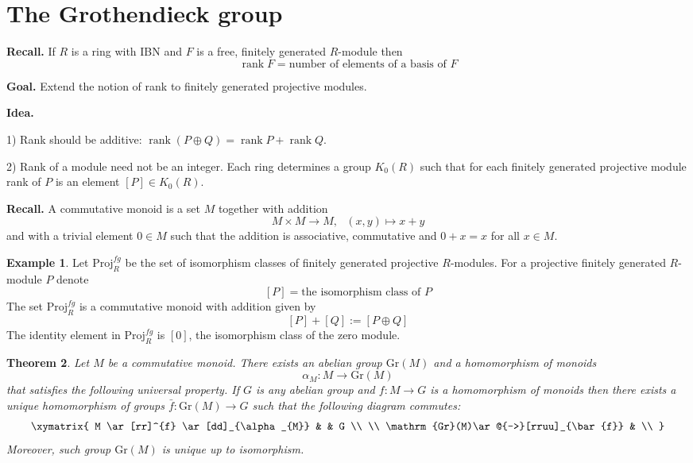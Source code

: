 \documentclass[12pt, letterpaper, oneside]{article}
\theoremstyle{plain}
\newtheorem{theorem}{Theorem}[section]
\theoremstyle{definition}
\newtheorem{example}[theorem]{Example}
\newcommand{\rank}{\operatorname{rank}}
\newcommand{\Projfg}{\mathrm {Proj}^{fg}}
\newcommand{\Gro}{\mathrm {Gr}}
\newcommand{\vs}{\vskip 5mm}
\begin{document}


\newpage
\section{The Grothendieck group}
\label{SEC_GROTHGROUP}


\textbf{Recall.}  If  $R$ is a ring with IBN and $F$ is a free, finitely generated 
$R$-module then 
$$\rank F = \text{number of elements of a basis of $F$}$$ 


\textbf{Goal.} Extend the notion of rank to finitely generated projective modules. 

\vs

\textbf{Idea.} 

1) Rank should be additive: $\rank (P\oplus Q) = \rank P + \rank Q$. 

2) Rank of a module need not be an integer. Each ring determines a
group $K_{0}(R)$ such that for each finitely generated projective module 
rank of $P$ is an element $[P]\in K_{0}(R)$.  


\vs\vs




\textbf{Recall.} A commutative monoid is a set $M$ together with addition 
$$M\times M\to M, \ \ \ (x,  y) \mapsto x + y$$
and with a trivial element $0\in M$ such that the addition is associative, 
commutative and $0+x = x$  for all $x\in M$.


\vs\vs

\begin{example}
Let $\Projfg_{R}$ be the set of isomorphism classes of finitely generated projective $R$-modules. 
For a projective finitely generated $R$-module $P$ denote
$$[P] = \text{the isomorphism class of $P$}$$ 
The set $\Projfg_{R}$ is a commutative monoid with addition given by 
$$[P]+[Q] := [P\oplus Q]$$
The identity element in $\Projfg_{R}$ is $[0]$, the isomorphism class of the zero module. 
\end{example}


\vs\vs


\begin{theorem}
\label{THM_GROTHGPEXISTENCE}
Let $M$ be a commutative monoid. There exists an abelian group $\Gro(M)$
and a homomorphism of monoids 
$$\alpha_{M}\colon M \to \Gro(M)$$
that satisfies the following universal property. If $G$ is any abelian group 
and $f\colon M \to G$ is a homomorphism of monoids then 
there exists a unique homomorphism of groups $\bar f\colon \Gro(M) \to G$ such that the 
following diagram commutes:
$$
\xymatrix{
M \ar[rr]^{f} \ar[dd]_{\alpha_{M}} & & G \\
\\
\Gro(M)\ar@{-->}[rruu]_{\bar{f}} & \\
}
$$
Moreover,  such group $\Gro(M)$ is unique up to isomorphism. 
\end{theorem}
\end{document}
